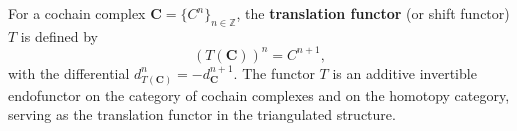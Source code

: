 For a cochain complex $\mathbf{C} = \{C^n\}_{n \in \mathbb{Z}}$, the \textbf{translation functor} (or shift functor) $T$ is defined by
$$
(T(\mathbf{C}))^n = C^{n+1},
$$
with the differential $d_{T(\mathbf{C})}^n = -d_{\mathbf{C}}^{n+1}$. The functor $T$ is an additive invertible endofunctor on the category of cochain complexes and on the homotopy category, serving as the translation functor in the triangulated structure.
